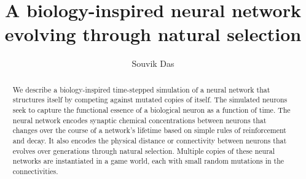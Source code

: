 \documentclass[10pt,letterpaper]{article}
\begin{document}
\title{A biology-inspired neural network evolving through natural selection}
\author{Souvik Das}
\maketitle

\begin{abstract}
We describe a biology-inspired time-stepped simulation of a neural network that structures itself by competing against mutated copies of itself. The simulated neurons seek to capture the functional essence of a biological neuron as a function of time. The neural network encodes synaptic chemical concentrations between neurons that changes over the course of a network's lifetime based on simple rules of reinforcement and decay. It also encodes the physical distance or connectivity between neurons that evolves over generations through natural selection. Multiple copies of these neural networks are instantiated in a game world, each with small random mutations in the connectivities.



\end{abstract}
\clearpage

\tableofcontents
\clearpage










\end{document}
